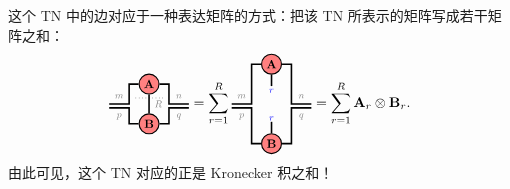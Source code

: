 这个 TN 中的边对应于一种表达矩阵的方式：把该 TN 所表示的矩阵写成若干矩阵之和：
$$\begin{tikzpicture}[baseline=\baseline]
    \tikzset{tensor/.style = {minimum size = 0.5cm,shape = circle,thick,draw=black,inner sep = 0pt}, edge/.style = {thick,line width=.4mm},every loop/.style={}}
    \def\y{0}
    \def\x{0}
    \node[tensor,fill=red!50!white] (A) at (\x,\y+0.5){\scalebox{0.85}{$\Ab$}};
    \node[tensor,fill=red!50!white] (B) at (\x,\y-0.5){\scalebox{0.85}{$\Bb$}};
    \draw[edge](A)--(B)node [midway, right] {\scalebox{0.7}{\dimcolor{$R$}}};
    \draw[edge](A) -- (\x+0.5,\y+0.5)--(\x+0.5,\y)--(\x+1,\y)node [midway, above] {\scalebox{0.7}{\dimcolor{$n$}}};
    \draw[edge](A) -- (\x-0.5,\y+0.5)--(\x-0.5,\y)--(\x-1,\y)node [midway, above] {\scalebox{0.7}{\dimcolor{$m$}}};
    \draw[edge](B) -- (\x+0.5,\y-0.5)--(\x+0.5,\y-0.1)--(\x+1,\y-0.1)node [midway, below] {\scalebox{0.7}{\dimcolor{$q$}}};
    \draw[edge](B) -- (\x-0.5,\y-0.5)--(\x-0.5,\y-0.1)--(\x-1,\y-0.1)node [midway, below] {\scalebox{0.7}{\dimcolor{$p$}}};
    \draw[dotted](\x+0.35,\y+0.15) -- (\x-0.35,\y+0.15);
    \end{tikzpicture}
    =
    \sum_{r=1}^R\begin{tikzpicture}[baseline=\baseline]
    \tikzset{tensor/.style = {minimum size = 0.5cm,shape = circle,thick,draw=black,inner sep = 0pt}, edge/.style = {thick,line width=.4mm},every loop/.style={}}
    \def\y{0}
    \def\x{0}
    \node[tensor,fill=red!50!white] (A) at (\x,\y+1){\scalebox{0.85}{$\Ab$}};
    \node[tensor,fill=red!50!white] (B) at (\x,\y-1){\scalebox{0.85}{$\Bb$}};
    \draw[edge](A) -- (\x,\y+0.45)node [pos=1.4]{\scalebox{0.7}{\indcolor{$r$}}};
    \draw[edge](B) -- (\x,\y-0.45)node [pos=1.3]{\scalebox{0.7}{\indcolor{$r$}}};
    \draw[edge](A) -- (\x+0.5,\y+1)--(\x+0.5,\y)--(\x+1,\y)node [midway, above] {\scalebox{0.7}{\dimcolor{$n$}}};
    \draw[edge](A) -- (\x-0.5,\y+1)--(\x-0.5,\y)--(\x-1,\y)node [midway, above] {\scalebox{0.7}{\dimcolor{$m$}}};
    \draw[edge](B) -- (\x+0.5,\y-1)--(\x+0.5,\y-0.1)--(\x+1,\y-0.1)node [midway, below] {\scalebox{0.7}{\dimcolor{$q$}}};
    \draw[edge](B) -- (\x-0.5,\y-1)--(\x-0.5,\y-0.1)--(\x-1,\y-0.1)node [midway, below] {\scalebox{0.7}{\dimcolor{$p$}}};
    \end{tikzpicture}
    =
    \sum_{r=1}^R\Ab_r\kron\Bb_r.$$
由此可见，这个 TN 对应的正是 Kronecker 积之和！ 
